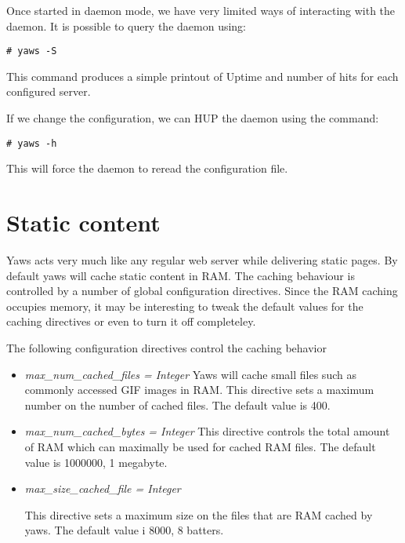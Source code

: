 \documentclass[11pt,oneside,english]{book}
\begin{document}
Once started in daemon mode, we have very limited ways of interacting
with the daemon. It is possible to query the daemon using:
\begin{verbatim}
# yaws -S
\end{verbatim}

This command produces a simple printout of Uptime and number of hits
for each configured server.

If we change the configuration, we can HUP the daemon using the
command:
\begin{verbatim}
# yaws -h
\end{verbatim}

This will force the daemon to reread the configuration file.



\chapter{Static content}

Yaws acts very much like any regular web server while delivering
static pages. By default yaws will cache static content in RAM.
The caching behaviour is controlled by a number of global
configuration directives. Since the RAM caching occupies memory, 
it may be interesting to tweak the default values for the caching directives
or even to turn it off completeley.

The following configuration directives control the caching behavior
\begin{itemize}
\item \textit{max\_num\_cached\_files = Integer}
Yaws  will  cache  small  files  such  as  commonly
              accessed  GIF images in RAM.  This directive sets a
              maximum number on the number of cached files.   The
              default value is 400.

\item\textit{max\_num\_cached\_bytes = Integer}
 This  directive  controls  the  total amount of RAM
             which can maximally be used for cached  RAM  files.
              The default value is 1000000, 1 megabyte.


\item\textit{max\_size\_cached\_file = Integer}

 This  directive  sets  a  maximum size on the files
              that are RAM cached by yaws.  The default  value  i
              8000, 8 batters.



\end{itemize}
\end{document}
